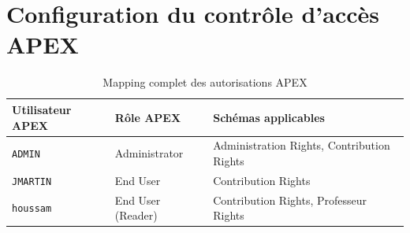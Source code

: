 \documentclass[12pt,a4paper,oneside]{report}
\begin{document}
\chapter{Configuration du contrôle d'accès APEX}
\label{ann:access}

\begin{table}[H]
  \centering
  \caption{Mapping complet des autorisations APEX}
  \begin{tabularx}{\linewidth}{@{}l l X@{}}
    \toprule
    \textbf{Utilisateur APEX} & \textbf{Rôle APEX} & \textbf{Schémas applicables} \\
    \midrule
    \texttt{ADMIN}   & Administrator & Administration Rights, Contribution Rights \\
    \texttt{JMARTIN} & End User & Contribution Rights \\
    \texttt{houssam} & End User (Reader) & Contribution Rights, Professeur Rights \\
    \bottomrule
  \end{tabularx}
  \label{tab:access-mapping}
\end{table}
\end{document}
